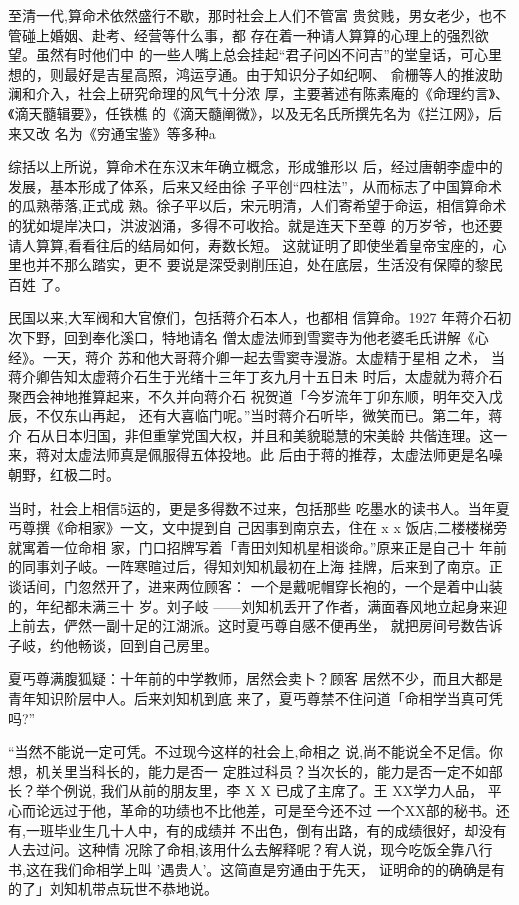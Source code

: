 至清一代,算命术依然盛行不歇，那时社会上人们不管富
贵贫贱，男女老少，也不管碰上婚姻、赴考、经营等什么事，都
存在着一种请人算算的心理上的强烈欲望。虽然有时他们中
的一些人嘴上总会挂起“君子问凶不问吉”的堂皇话，可心里
想的，则最好是吉星高照，鸿运亨通。由于知识分子如纪啊、
俞栅等人的推波助澜和介入，社会上研究命理的风气十分浓
厚，主要著述有陈素庵的《命理约言》、《滴天髓辑要》，任铁樵
的《滴天髓阐微》，以及无名氏所撰先名为《拦江网》，后来又改
名为《穷通宝鉴》等多种a

综括以上所说，算命术在东汉末年确立概念，形成雏形以
后，经过唐朝李虚中的发展，基本形成了体系，后来又经由徐
子平创“四柱法”，从而标志了中国算命术的瓜熟蒂落,正式成
熟。徐子平以后，宋元明清，人们寄希望于命运，相信算命术
的犹如堤岸决口，洪波汹涌，多得不可收拾。就是连天下至尊
的万岁爷，也还要请人算算,看看往后的结局如何，寿数长短。
这就证明了即使坐着皇帝宝座的，心里也并不那么踏实，更不
要说是深受剥削压迫，处在底层，生活没有保障的黎民百姓
了。

民国以来,大军阀和大官僚们，包括蒋介石本人，也都相
信算命。1927 年蒋介石初次下野，回到奉化溪口，特地请名
僧太虚法师到雪窦寺为他老婆毛氏讲解《心经》。一天，蒋介
苏和他大哥蒋介卿一起去雪窦寺漫游。太虚精于星相 之术，
当蒋介卿告知太虚蒋介石生于光绪十三年丁亥九月十五日未
时后，太虚就为蒋介石聚西会神地推算起来，不久并向蒋介石
祝贺道「今岁流年丁卯东顺，明年交入戊辰，不仅东山再起，
还有大喜临门呢。”当时蒋介石听毕，微笑而已。第二年，蒋介
石从日本归国，非但重掌党国大权，并且和美貌聪慧的宋美龄
共偕连理。这一来，蒋对太虚法师真是佩服得五体投地。此
后由于蒋的推荐，太虚法师更是名噪朝野，红极二时。

当时，社会上相信5运的，更是多得数不过来，包括那些
吃墨水的读书人。当年夏丐尊撰《命相家》一文，文中提到自
己因事到南京去，住在 x x 饭店,二楼楼梯旁就寓着一位命相
家，门口招牌写着「青田刘知机星相谈命。”原来正是自己十
年前的同事刘子岐。一阵寒暄过后，得知刘知机最初在上海
挂牌，后来到了南京。正谈话间，门忽然开了，进来两位顾客：
一个是戴呢帽穿长袍的，一个是着中山装的，年纪都未满三十
岁。刘子岐
——刘知机丢开了作者，满面春风地立起身来迎
上前去，俨然一副十足的江湖派。这时夏丐尊自感不便再坐，
就把房间号数告诉子岐，约他畅谈，回到自己房里。

夏丐尊满腹狐疑：十年前的中学教师，居然会卖卜？顾客
居然不少，而且大都是青年知识阶层中人。后来刘知机到底
来了，夏丐尊禁不住问道「命相学当真可凭吗?”

“当然不能说一定可凭。不过现今这样的社会上,命相之
说,尚不能说全不足信。你想，机关里当科长的，能力是否一
定胜过科员？当次长的，能力是否一定不如部长？举个例说,
我们从前的朋友里，李 X X 已成了主席了。王 XX学力人品，
平心而论远过于他，革命的功绩也不比他差，可是至今还不过
一个XX部的秘书。还有,一班毕业生几十人中，有的成绩并
不出色，倒有出路，有的成绩很好，却没有人去过问。这种情
况除了命相,该用什么去解释呢？宥人说，现今吃饭全靠八行
书,这在我们命相学上叫 '遇贵人'。这简直是穷通由于先天，
证明命的的确确是有的了」刘知机带点玩世不恭地说。

